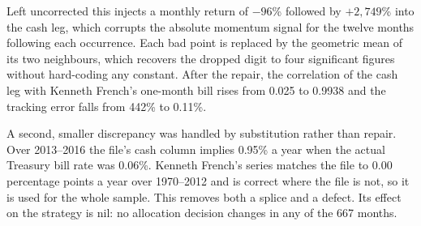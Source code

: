 \documentclass[11pt,a4paper]{article}
\begin{document}
Left uncorrected this injects a monthly return of $-96$\% followed by
$+2{,}749$\% into the cash leg, which corrupts the absolute momentum signal for
the twelve months following each occurrence. Each bad point is replaced by the
geometric mean of its two neighbours, which recovers the dropped digit to four
significant figures without hard-coding any constant. After the repair, the
correlation of the cash leg with Kenneth French's one-month bill rises from
0.025 to 0.9938 and the tracking error falls from 442\% to 0.11\%.

A second, smaller discrepancy was handled by substitution rather than repair.
Over 2013--2016 the file's cash column implies 0.95\% a year when the actual
Treasury bill rate was 0.06\%. Kenneth French's series matches the file to 0.00
percentage points a year over 1970--2012 and is correct where the file is not,
so it is used for the whole sample. This removes both a splice and a defect. Its
effect on the strategy is nil: no allocation decision changes in any of the 667
months.
\end{document}
